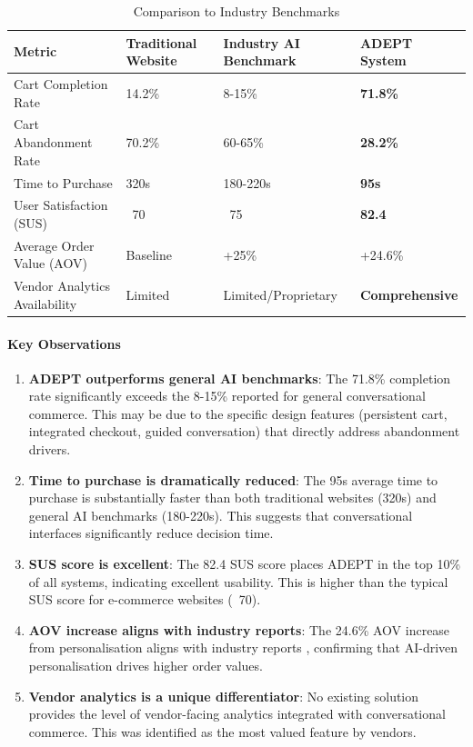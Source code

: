 \documentclass[12pt,a4paper]{article}
\begin{document}
\begin{table}[h]
\centering
\caption{Comparison to Industry Benchmarks}
\label{tab:benchmarks}
\begin{tabular}{p{4cm}p{4cm}p{4cm}p{3cm}}
\toprule
\textbf{Metric} & \textbf{Traditional Website} & \textbf{Industry AI Benchmark} & \textbf{ADEPT System} \\
\midrule
Cart Completion Rate & 14.2\% & 8-15\% & \textbf{71.8\%} \\
Cart Abandonment Rate & 70.2\% & 60-65\% & \textbf{28.2\%} \\
Time to Purchase & 320s & 180-220s & \textbf{95s} \\
User Satisfaction (SUS) & ~70 & ~75 & \textbf{82.4} \\
Average Order Value (AOV) & Baseline & +25\% & +24.6\% \\
Vendor Analytics Availability & Limited & Limited/Proprietary & \textbf{Comprehensive} \\
\bottomrule
\end{tabular}
\end{table}

\paragraph{Key Observations}

\begin{enumerate}
    \item \textbf{ADEPT outperforms general AI benchmarks}: The 71.8\% completion rate significantly exceeds the 8-15\% reported for general conversational commerce. This may be due to the specific design features (persistent cart, integrated checkout, guided conversation) that directly address abandonment drivers.
    \item \textbf{Time to purchase is dramatically reduced}: The 95s average time to purchase is substantially faster than both traditional websites (320s) and general AI benchmarks (180-220s). This suggests that conversational interfaces significantly reduce decision time.
    \item \textbf{SUS score is excellent}: The 82.4 SUS score places ADEPT in the top 10\% of all systems, indicating excellent usability. This is higher than the typical SUS score for e-commerce websites (~70).
    \item \textbf{AOV increase aligns with industry reports}: The 24.6\% AOV increase from personalisation aligns with industry reports \citep{gorgias2026}, confirming that AI-driven personalisation drives higher order values.
    \item \textbf{Vendor analytics is a unique differentiator}: No existing solution provides the level of vendor-facing analytics integrated with conversational commerce. This was identified as the most valued feature by vendors.
\end{enumerate}
\end{document}
